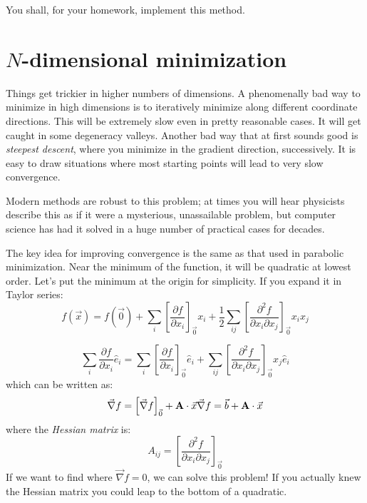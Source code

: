 You shall, for your homework, implement this method.

\section{$N$-dimensional minimization}

Things get trickier in higher numbers of dimensions. A phenomenally
bad way to minimize in high dimensions is to iteratively minimize
along different coordinate directions.  This will be extremely slow
even in pretty reasonable cases.  It will get caught in some
degeneracy valleys.  Another bad way that at first sounds good is {\it
  steepest descent}, where you minimize in the gradient direction,
successively. It is easy to draw situations where most starting
points will lead to very slow convergence.

Modern methods are robust to this problem; at times you will hear
physicists describe this as if it were a mysterious, unassailable
problem, but computer science has had it solved in a huge number of
practical cases for decades.

The key idea for improving convergence is the same as that used in
parabolic minimization. Near the minimum of the function, it will be
quadratic at lowest order. Let's put the minimum at the origin for
simplicity. If you expand it in Taylor series:
\begin{equation}
  f(\vec{x}) = f(\vec{0})
  + \sum_i \left[\frac{\partial f}{\partial x_i}\right]_{\vec{0}}  x_i
  + \frac{1}{2} \sum_{ij} \left[\frac{\partial^2 f}{\partial x_i \partial x_j}\right]_{\vec{0}}
  x_i x_j
\end{equation}


\begin{answer}
\begin{equation}
\sum_i \frac{\partial f}{\partial x_i} {\hat e}_i = \sum_i
\left[\frac{\partial f}{\partial x_i}\right]_{\vec{0}} {\hat e}_i +
\sum_{ij} \left[\frac{\partial^2 f}{\partial x_i \partial
    x_j}\right]_{\vec{0}} x_j {\hat e}_i
\end{equation}
which can be written as:
\begin{equation}
\vec{\nabla}f = \left[\vec{\nabla}f \right]_{\vec{0}} + 
{\bf A}\cdot{\vec{x}}
\vec{\nabla}f = \vec{b} +
{\bf A}\cdot{\vec{x}}
\end{equation}
where the {\it Hessian matrix} is:
\begin{equation}
A_{ij} = 
\left[\frac{\partial^2 f}{\partial x_i \partial x_j}\right]_{\vec{0}}
\end{equation}
If we want to find where $\vec{\nabla}f=0$, we can solve this problem!
If you actually knew the Hessian matrix you could leap to the bottom
of a quadratic.
\end{answer}

